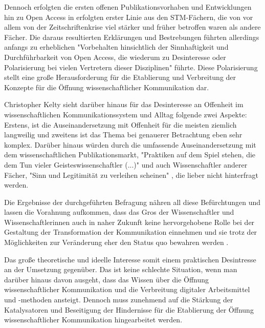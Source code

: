 Dennoch erfolgten die ersten offenen Publikationsvorhaben und Entwicklungen hin zu Open Access in erfolgten erster Linie aus den STM-Fächern, die von vor allem von der Zeitschriftenkrise viel stärker und früher betroffen waren als andere Fächer. Die daraus resultierten Erklärungen und Bestrebungen führten allerdings anfangs zu erheblichen "Vorbehalten hinsichtlich der Sinnhaftigkeit und Durchführbarkeit von Open Access, die wiederum zu Desinteresse oder Polarisierung bei vielen Vertretern dieser Disziplinen" \cite{naeder_2010_open} führte. Diese Polarisierung stellt eine große Herausforderung für die Etablierung und Verbreitung der Konzepte für die Öffnung wissenschaftlicher Kommunikation dar.

Christopher Kelty sieht darüber hinaus für das Desinteresse an Offenheit im wissenschaftlichen Kommunikationssystem und Alltag folgende zwei Aspekte: Erstens, ist die Auseinandersetzung mit Offenheit für die meisten ziemlich langweilig und zweitens ist das Thema bei genauerer Betrachtung eben sehr komplex. Darüber hinaus würden durch die umfassende Auseinandersetzung mit dem wissenschaftlichen Publikationsmarkt, "Praktiken auf dem Spiel stehen, die dem Tun vieler Geisteswissenschaftler (...)" und auch Wissenschaftler anderer Fächer, "Sinn und Legitimität zu verleihen scheinen" \cite{Hirschi_2015_buch_oa}, die lieber nicht hinterfragt werden.

Die Ergebnisse der durchgeführten Befragung nähren all diese Befürchtungen und lassen die Vorahnung aufkommen, dass das Gros der Wissenschaftler und Wissenschaftlerinnen auch in naher Zukunft keine hervorgehobene Rolle bei der Gestaltung der Transformation der Kommunikation einnehmen und sie trotz der Möglichkeiten zur Veränderung eher den Status quo bewahren werden \cite{nosek_2012_scientific}.

Das große theoretische und ideelle Interesse somit einem praktischen Desintresse an der Umsetzung gegenüber. Das ist keine schlechte Situation, wenn man darüber hinaus davon ausgeht, dass das Wissen über die Öffnung wissenschaftlicher Kommunikation und die Verbreitung digitaler Arbeitsmittel und -methoden ansteigt. Dennoch muss zunehmend auf die Stärkung der Katalysatoren und Beseitigung der Hindernisse für die Etablierung der Öffnung wissenschaftlicher Kommunikation hingearbeitet werden.

